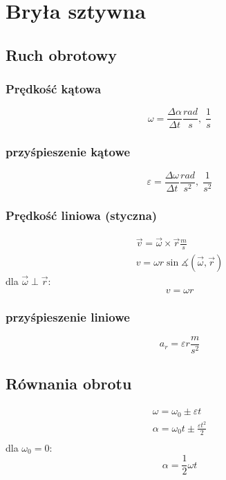   \chapter{Bryła sztywna}
    \section{Ruch obrotowy}
      \subsection{Prędkość kątowa}
        \begin{equation}
          \omega = \frac{\Delta\alpha}{\Delta t} \unit{\frac{rad}{s},\;\frac{1}{s}}
        \end{equation}
      \subsection{przyśpieszenie kątowe}
        \begin{equation}
          \varepsilon = \frac{\Delta\omega}{\Delta t} \unit{\frac{rad}{s^2},\;\frac{1}{s^2}}
        \end{equation}
      \subsection{Prędkość liniowa (styczna)}
        \begin{gather}
          \vec v = \vec\omega \times \vec r\unit{\frac{m}{s}}\\
          v = \omega r\sin\measuredangle(\vec\omega, \vec r)
        \end{gather}
        dla $\vec\omega \perp \vec r$:
        \begin{equation}
          v =\omega r
        \end{equation}
      \subsection{przyśpieszenie liniowe}
        \begin{equation}
          a_r = \varepsilon r \unit{\frac{m}{s^2}}
        \end{equation}
      \section{Równania obrotu}
        \begin{gather}
          \omega = \omega_0 \pm \varepsilon t\\
          \alpha = \omega_0t \pm \frac{\varepsilon t^2}{2}\\
        \end{gather}
        dla $\omega_0 = 0$:
        \begin{equation}
          \alpha = \frac{1}{2} \omega t
        \end{equation}
